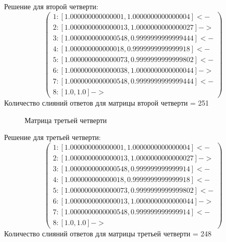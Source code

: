 \documentclass{article}
\begin{document}
Решение для второй четверти:
\begin{equation*}
\begin{pmatrix}
1 : [ 1.000000000000001 , 1.0000000000000004 ] <- \\ 
2 : [ 1.0000000000000013 , 1.0000000000000027 ] -> \\
3 : [ 1.0000000000000548 , 0.9999999999999444 ] <- \\
4 : [ 1.000000000000018 , 0.9999999999999918 ] <- \\ 
5 : [ 1.0000000000000073 , 0.9999999999999802 ] <- \\
6 : [ 1.0000000000000038 , 1.0000000000000044 ] -> \\
7 : [ 1.0000000000000548 , 0.9999999999999444 ] <- \\
8 : [ 1.0 , 1.0 ]    ->
\end{pmatrix}
\end{equation*}
Количество слияний ответов для матрицы второй четверти = 251

\begin{figure}[h]
\caption{Матрица третьей четверти}
\label{fig:image}
\end{figure}

Решение для третьей четверти:
\begin{equation*}
\begin{pmatrix}
1 : [ 1.000000000000001 , 1.0000000000000004 ] <- \\
2 : [ 1.0000000000000013 , 1.0000000000000027 ] -> \\
3 : [ 1.0000000000000548 , 0.999999999999914 ] <- \\ 
4 : [ 1.000000000000018 , 0.9999999999999918 ] <- \\ 
5 : [ 1.0000000000000073 , 0.9999999999999802 ] <- \\ 
6 : [ 1.0000000000000013 , 1.0000000000000044 ] -> \\
7 : [ 1.0000000000000548 , 0.999999999999914 ] <- \\
8 : [ 1.0 , 1.0 ]    ->
\end{pmatrix}
\end{equation*}
Количество слияний ответов для матрицы третьей четверти = 248
\end{document}
